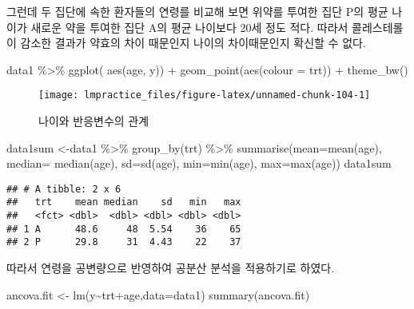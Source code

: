 \documentclass[
]{book}
\newenvironment{Shaded}{\begin{snugshade}}{\end{snugshade}}
\newcommand{\AttributeTok}[1]{\textcolor[rgb]{0.77,0.63,0.00}{#1}}
\newcommand{\FunctionTok}[1]{\textcolor[rgb]{0.00,0.00,0.00}{#1}}
\newcommand{\NormalTok}[1]{#1}
\newcommand{\OtherTok}[1]{\textcolor[rgb]{0.56,0.35,0.01}{#1}}
\newcommand{\SpecialCharTok}[1]{\textcolor[rgb]{0.00,0.00,0.00}{#1}}
\begin{document}
그런데 두 집단에 속한 환자들의 연령를 비교해 보면 위약를 투여한 집단 P의 평균 나이가 새로운 약을 투여한 집단 A의 평균 나이보다 20세 정도 적다. 따라서 콜레스테롤이 감소한 결과가 약효의 차이 때문인지 나이의 차이때문인지 확신할 수 없다.

\begin{Shaded}
\begin{Highlighting}[]
\NormalTok{data1 }\SpecialCharTok{\%\textgreater{}\%} \FunctionTok{ggplot}\NormalTok{( }\FunctionTok{aes}\NormalTok{(age, y)) }\SpecialCharTok{+} \FunctionTok{geom\_point}\NormalTok{(}\FunctionTok{aes}\NormalTok{(}\AttributeTok{colour =}\NormalTok{ trt)) }\SpecialCharTok{+} \FunctionTok{theme\_bw}\NormalTok{()}
\end{Highlighting}
\end{Shaded}

\begin{figure}

{\centering \texttt{[image: lmpractice\_files/figure-latex/unnamed-chunk-104-1]} 

}

\caption{나이와 반응변수의 관계}\label{fig:unnamed-chunk-104}
\end{figure}

\begin{Shaded}
\begin{Highlighting}[]
\NormalTok{data1sum }\OtherTok{\textless{}{-}}\NormalTok{data1 }\SpecialCharTok{\%\textgreater{}\%} \FunctionTok{group\_by}\NormalTok{(trt)  }\SpecialCharTok{\%\textgreater{}\%}  \FunctionTok{summarise}\NormalTok{(}\AttributeTok{mean=}\FunctionTok{mean}\NormalTok{(age), }\AttributeTok{median=} \FunctionTok{median}\NormalTok{(age), }\AttributeTok{sd=}\FunctionTok{sd}\NormalTok{(age), }\AttributeTok{min=}\FunctionTok{min}\NormalTok{(age), }\AttributeTok{max=}\FunctionTok{max}\NormalTok{(age))}
\NormalTok{data1sum }
\end{Highlighting}
\end{Shaded}

\begin{verbatim}
## # A tibble: 2 x 6
##   trt    mean median    sd   min   max
##   <fct> <dbl>  <dbl> <dbl> <dbl> <dbl>
## 1 A      48.6     48  5.54    36    65
## 2 P      29.8     31  4.43    22    37
\end{verbatim}

따라서 연령을 공변량으로 반영하여 공분산 분석을 적용하기로 하였다.

\begin{Shaded}
\begin{Highlighting}[]
\NormalTok{ancova.fit }\OtherTok{\textless{}{-}} \FunctionTok{lm}\NormalTok{(y}\SpecialCharTok{\textasciitilde{}}\NormalTok{trt}\SpecialCharTok{+}\NormalTok{age,}\AttributeTok{data=}\NormalTok{data1)}
\FunctionTok{summary}\NormalTok{(ancova.fit)}
\end{Highlighting}
\end{Shaded}
\end{document}
